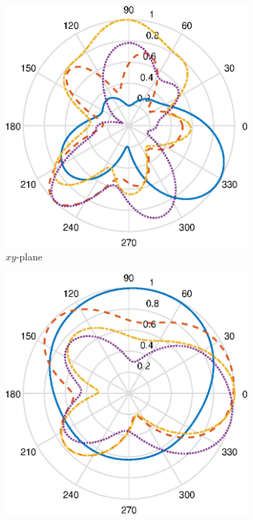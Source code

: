 \begin{figure}[H]
    \centering
    \begin{subfigure}[b]{0.3\textwidth}
        \includegraphics[width=\textwidth]{img/ff_cell_xy.eps}
        \caption{$xy$-plane}
        \label{fig:ff_xy_cell}
    \end{subfigure}
    \begin{subfigure}[b]{0.3\textwidth}
        \includegraphics[width=\textwidth]{img/ff_cell_xz.eps}

\end{subfigure}
\end{figure}
